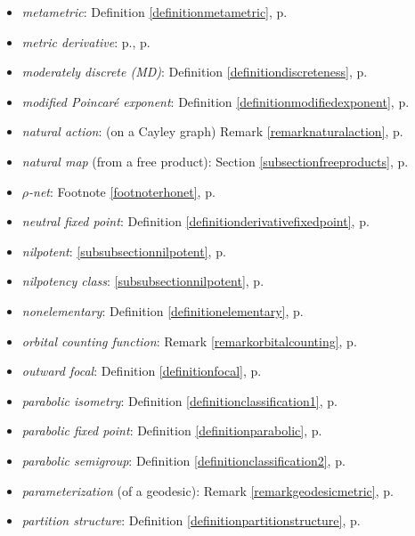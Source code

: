 \begin{itemize}
\item\emph{metametric}: Definition \ref{definitionmetametric}, p.\pageref{definitionmetametric}
\item\emph{metric derivative}: p.\pageref{subsectionderivatives}, p.\pageref{subsubsectionderivativemaps}
\item\emph{moderately discrete (MD)}: Definition \ref{definitiondiscreteness}, p.\pageref{definitiondiscreteness}
\item\emph{modified Poincar\'e exponent}: Definition \ref{definitionmodifiedexponent}, p.\pageref{definitionmodifiedexponent}
\item\emph{natural action}: (on a Cayley graph) Remark \ref{remarknaturalaction}, p.\pageref{remarknaturalaction}
\item\emph{natural map} (from a free product): Section \ref{subsectionfreeproducts}, p.\pageref{subsectionfreeproducts}
\item\emph{$\rho$-net}: Footnote \ref{footnoterhonet}, p.\pageref{footnoterhonet}
\item\emph{neutral fixed point}: Definition \ref{definitionderivativefixedpoint}, p.\pageref{definitionderivativefixedpoint}
\item\emph{nilpotent}: \6\ref{subsubsectionnilpotent}, p.\pageref{subsubsectionnilpotent}
\item\emph{nilpotency class}: \6\ref{subsubsectionnilpotent}, p.\pageref{subsubsectionnilpotent}
\item\emph{nonelementary}: Definition \ref{definitionelementary}, p.\pageref{definitionelementary}
\item\emph{orbital counting function}: Remark \ref{remarkorbitalcounting}, p.\pageref{remarkorbitalcounting}
\item\emph{outward focal}: Definition \ref{definitionfocal}, p.\pageref{definitionfocal}
\item\emph{parabolic isometry}: Definition \ref{definitionclassification1}, p.\pageref{definitionclassification1}
\item\emph{parabolic fixed point}: Definition \ref{definitionparabolic}, p.\pageref{definitionparabolic}
\item\emph{parabolic semigroup}: Definition \ref{definitionclassification2}, p.\pageref{definitionclassification2}
\item\emph{parameterization} (of a geodesic): Remark \ref{remarkgeodesicmetric}, p.\pageref{remarkgeodesicmetric}
\item\emph{partition structure}: Definition \ref{definitionpartitionstructure}, p.\pageref{definitionpartitionstructure}

\end{itemize}
